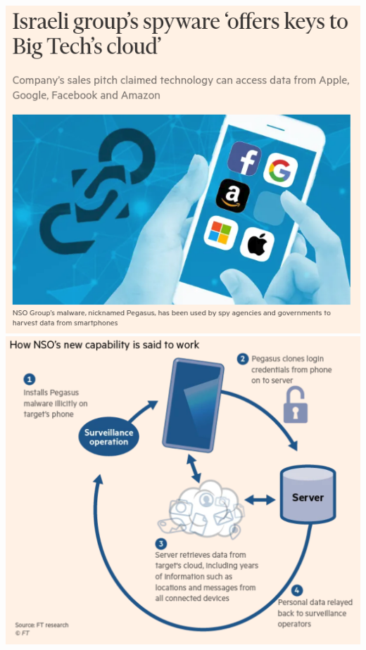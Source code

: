 \documentclass[nobackground,dvipsnames,table]{beamer}
\begin{document}
\begin{frame}{}
    \begin{columns}
            \includegraphics[width=\textwidth]{nso-article}
            \includegraphics[width=\textwidth]{nso-pegasus-diagram}
    \end{columns}
\end{frame}
\end{document}
